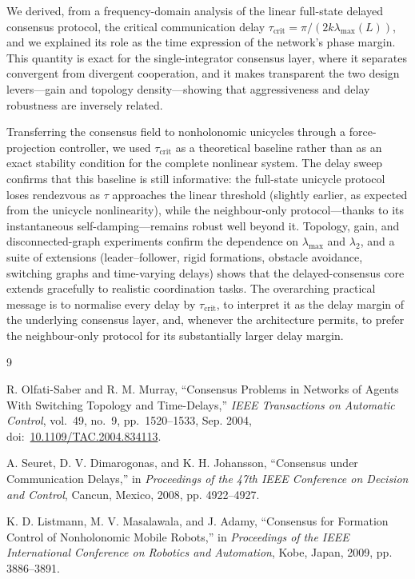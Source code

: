\documentclass[11pt,a4paper]{article}
\newcommand{\Lap}{L}
\newcommand{\taucrit}{\tau_{\mathrm{crit}}}
\newcommand{\lammax}{\lambda_{\max}}
\begin{document}
We derived, from a frequency-domain analysis of the linear full-state delayed consensus
protocol, the critical communication delay $\taucrit=\pi/(2k\lammax(\Lap))$, and we explained
its role as the time expression of the network's phase margin. This quantity is exact for the
single-integrator consensus layer, where it separates convergent from divergent cooperation,
and it makes transparent the two design levers---gain and topology density---showing that
aggressiveness and delay robustness are inversely related.

Transferring the consensus field to nonholonomic unicycles through a force-projection
controller, we used $\taucrit$ as a theoretical baseline rather than as an exact stability
condition for the complete nonlinear system. The delay sweep confirms that this baseline is
still informative: the full-state unicycle protocol loses rendezvous as $\tau$ approaches the
linear threshold (slightly earlier, as expected from the unicycle nonlinearity), while the
neighbour-only protocol---thanks to its instantaneous self-damping---remains robust well
beyond it. Topology, gain, and disconnected-graph experiments confirm the dependence on
$\lammax$ and $\lambda_2$, and a suite of extensions (leader--follower, rigid formations,
obstacle avoidance, switching graphs and time-varying delays) shows that the delayed-consensus
core extends gracefully to realistic coordination tasks. The overarching practical message is
to normalise every delay by $\taucrit$, to interpret it as the delay margin of the underlying
consensus layer, and, whenever the architecture permits, to prefer the neighbour-only protocol
for its substantially larger delay margin.


\begin{thebibliography}{9}

R. Olfati-Saber and R. M. Murray,
``Consensus Problems in Networks of Agents With Switching Topology and Time-Delays,''
\emph{IEEE Transactions on Automatic Control}, vol.~49, no.~9, pp.~1520--1533,
Sep. 2004, doi:~\href{https://doi.org/10.1109/TAC.2004.834113}{10.1109/TAC.2004.834113}.

A. Seuret, D. V. Dimarogonas, and K. H. Johansson,
``Consensus under Communication Delays,''
in \emph{Proceedings of the 47th IEEE Conference on Decision and Control},
Cancun, Mexico, 2008, pp. 4922--4927.

K. D. Listmann, M. V. Masalawala, and J. Adamy,
``Consensus for Formation Control of Nonholonomic Mobile Robots,''
in \emph{Proceedings of the IEEE International Conference on Robotics and Automation},
Kobe, Japan, 2009, pp. 3886--3891.

\end{thebibliography}
\end{document}
